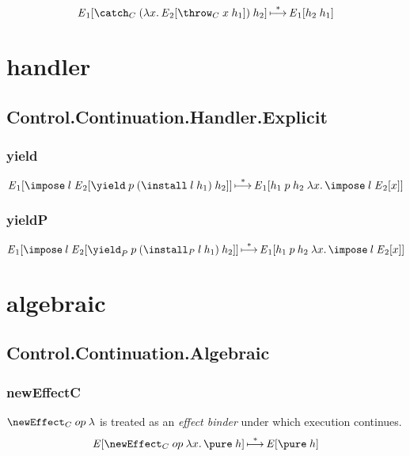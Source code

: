 \documentclass{report}
\begin{document}
\[
  {\E}_1 \sq{\catch_C \app \br{ \lam x {{\E}_2 \sq{\throw_C \app x \app h_1}} } \app h_2}
    \step^*
  {\E}_1 \sq{h_2 \app h_1}
\]


\chapter{handler} %

\section{Control.Continuation.Handler.Explicit}

\subsection{yield}

\[
  {\E}_1 \sq{\impose \app l \app {\E}_2 \sq{\yield \app p \app {\left( \install \app l \app h_1 \right)} \app h_2}}
    \step^*
  {\E}_1 \sq{h_1 \app p \app h_2 \app \lam x {\impose \app l \app {\E}_2 \sq x}}
\]

\subsection{yieldP}

\[
  {\E}_1 \sq{\impose \app l \app {\E}_2 \sq{\yield_P \app p \app {\left( \install_P \app l \app h_1 \right)} \app h_2}}
    \step^*
  {\E}_1 \sq{h_1 \app p \app h_2 \app \lam x {\impose \app l \app {\E}_2 \sq x}}
\]


\chapter{algebraic} %

\section{Control.Continuation.Algebraic}

\subsection{newEffectC}

\( \newEffect_C \app op \app \lambda \) is treated as an \emph{effect binder} under which execution continues. \[
  {\E} \sq{\newEffect_C \app op \app \lam x {\pure \app h}}
    \step^*
  {\E} \sq{\pure \app h}
\]
\end{document}
